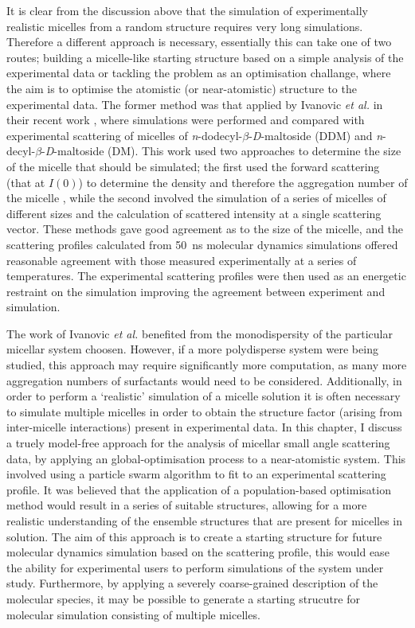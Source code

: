 It is clear from the discussion above that the simulation of experimentally realistic micelles from a random structure requires very long simulations.
Therefore a different approach is necessary, essentially this can take one of two routes; building a micelle-like starting structure based on a simple analysis of the experimental data or tackling the problem as an optimisation challange, where the aim is to optimise the atomistic (or near-atomistic) structure to the experimental data.
The former method was that applied by Ivanovic \emph{et al.} in their recent work \cite{ivanovic_temperature-dependent_2018}, where simulations were performed and compared with experimental scattering of micelles of \emph{n}-dodecyl-$\beta$-\emph{D}-maltoside (DDM) and \emph{n}-decyl-$\beta$-\emph{D}-maltoside (DM).
This work used two approaches to determine the size of the micelle that should be simulated; the first used the forward scattering (that at $I(0)$) to determine the density and therefore the aggregation number of the micelle \cite{lipfert_size_2007}, while the second involved the simulation of a series of micelles of different sizes and the calculation of scattered intensity at a single scattering vector.
These methods gave good agreement as to the size of the micelle, and the scattering profiles calculated from \SI{50}{\nano\second} molecular dynamics simulations offered reasonable agreement with those measured experimentally at a series of temperatures.
The experimental scattering profiles were then used as an energetic restraint on the simulation improving the agreement between experiment and simulation.

The work of Ivanovic \emph{et al.} benefited from the monodispersity of the particular micellar system choosen.
However, if a more polydisperse system were being studied, this approach may require significantly more computation, as many more aggregation numbers of surfactants would need to be considered.
Additionally, in order to perform a `realistic' simulation of a micelle solution it is often necessary to simulate multiple micelles in order to obtain the structure factor (arising from inter-micelle interactions) present in experimental data.
In this chapter, I discuss a truely model-free approach for the analysis of micellar small angle scattering data, by applying an global-optimisation process to a near-atomistic system.
This involved using a particle swarm algorithm to fit to an experimental scattering profile.
It was believed that the application of a population-based optimisation method would result in a series of suitable structures, allowing for a more realistic understanding of the ensemble structures that are present for micelles in solution.
The aim of this approach is to create a starting structure for future molecular dynamics simulation based on the scattering profile, this would ease the ability for experimental users to perform simulations of the system under study.
Furthermore, by applying a severely coarse-grained description of the molecular species, it may be possible to generate a starting strucutre for molecular simulation consisting of multiple micelles.
